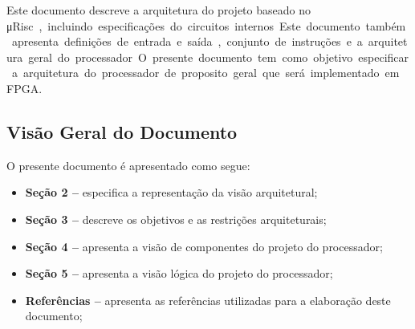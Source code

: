 \documentclass{article}
\begin{document}
 Este documento descreve a arquitetura do projeto baseado no \si\micro Risc, incluindo especificações do circuitos internos. Este documento também apresenta definições de entrada e saída, conjunto de instruções e a arquitetura geral do processador. O presente documento tem como objetivo especificar a arquitetura do processador de proposito geral que será implementado em FPGA.

\subsection{Visão Geral do Documento}
O presente documento é apresentado como segue:
  \begin{itemize}
       \item \textbf{Seção 2 --} especifica a representação da visão arquitetural;
       \item \textbf{Seção 3 --} descreve os objetivos e as restrições arquiteturais;
       \item \textbf{Seção 4 --} apresenta a visão de componentes do projeto do processador;
       \item \textbf{Seção 5 --} apresenta a visão lógica do projeto do processador;
       \item \textbf{Referências --} apresenta  as  referências  utilizadas  para  a  elaboração  deste documento;
  \end{itemize}
  
  \newpage
\end{document}
